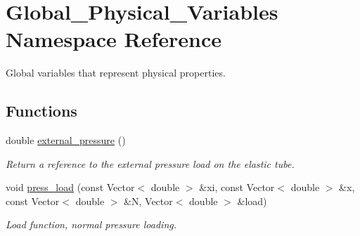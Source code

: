 \hypertarget{namespaceGlobal__Physical__Variables}{}\section{Global\+\_\+\+Physical\+\_\+\+Variables Namespace Reference}
\label{namespaceGlobal__Physical__Variables}


Global variables that represent physical properties.  


\subsection*{Functions}
\begin{DoxyCompactItemize}
\item 
double \hyperlink{namespaceGlobal__Physical__Variables_a80149b39ce76ea0a779f7493905eb1b8}{external\+\_\+pressure} ()
\begin{DoxyCompactList}\small\item\em Return a reference to the external pressure load on the elastic tube. \end{DoxyCompactList}\item 
void \hyperlink{namespaceGlobal__Physical__Variables_a86fd8f502cb8c4c7939ffae742f023eb}{press\+\_\+load} (const Vector$<$ double $>$ \&xi, const Vector$<$ double $>$ \&x, const Vector$<$ double $>$ \&N, Vector$<$ double $>$ \&load)
\begin{DoxyCompactList}\small\item\em Load function, normal pressure loading. \end{DoxyCompactList}\end{DoxyCompactItemize}
